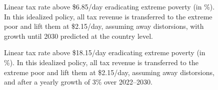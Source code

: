 \documentclass[12pt,english]{article}
\begin{document}
\begin{figure}[!htb]
  \caption[Anti-extreme-poverty tax above \$6.85/day after 3\% growth (HFCE-scaled).]{Linear tax rate above \$6.85/day eradicating extreme poverty (in \%). In this idealized policy, all tax revenue is transferred to the extreme poor and lift them at \$2.15/day, assuming away distorsions, with growth until 2030 predicted at the country level. 
  }\label{fig:antipoverty_2_tax_7_reg}
\end{figure}

\begin{figure}[!htb]
  \caption[Anti-extreme-poverty tax above \$18.15/day after 3\% growth.]{Linear tax rate above \$18.15/day eradicating extreme poverty (in \%). In this idealized policy, all tax revenue is transferred to the extreme poor and lift them at \$2.15/day, assuming away distorsions, and after a yearly growth of 3\% over 2022--2030. 
  }\label{fig:antipoverty_2_tax_18_average}
\end{figure}
\end{document}
